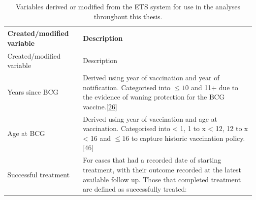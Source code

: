 \documentclass[11pt,twoside]{bristolthesis}
\begin{document}
  \begin{longtable}[]{@{}ll@{}}
  \caption{\label{tab:created-var} Variables derived or modified from the ETS system for use in the analyses throughout this thesis.}\tabularnewline
  \toprule
  \begin{minipage}[b]{0.33\columnwidth}\raggedright
  Created/modified variable\strut
  \end{minipage} & \begin{minipage}[b]{0.62\columnwidth}\raggedright
  Description\strut
  \end{minipage}\tabularnewline
  \midrule
  \endfirsthead
  \toprule
  \begin{minipage}[b]{0.33\columnwidth}\raggedright
  Created/modified variable\strut
  \end{minipage} & \begin{minipage}[b]{0.62\columnwidth}\raggedright
  Description\strut
  \end{minipage}\tabularnewline
  \midrule
  \endhead
  \begin{minipage}[t]{0.33\columnwidth}\raggedright
  Years since BCG\strut
  \end{minipage} & \begin{minipage}[t]{0.62\columnwidth}\raggedright
  Derived using year of vaccination and year of
  notification. Categorised into \(\leq 10\) and 11+
  due to the evidence of waning protection for the
  BCG vaccine.{[}\protect\hyperlink{ref-Abubakar2013}{26}{]}\strut
  \end{minipage}\tabularnewline
  \begin{minipage}[t]{0.33\columnwidth}\raggedright
  Age at BCG\strut
  \end{minipage} & \begin{minipage}[t]{0.62\columnwidth}\raggedright
  Derived using year of vaccination and age at
  vaccination. Categorised into \textless{} 1, 1 to x \textless{} 12, 12
  to x \textless{} 16 and \(\leq 16\) to capture historic
  vaccination policy.{[}\protect\hyperlink{ref-PublicHealthEngland2011a}{46}{]}\strut
  \end{minipage}\tabularnewline
  \begin{minipage}[t]{0.33\columnwidth}\raggedright
  Successful treatment\strut
  \end{minipage} & \begin{minipage}[t]{0.62\columnwidth}\raggedright
  For cases that had a recorded date of starting
  treatment, with their outcome recorded at the
  latest available follow up. Those that completed
  treatment are defined as successfully treated:

\end{minipage}
\end{longtable}
\end{document}
